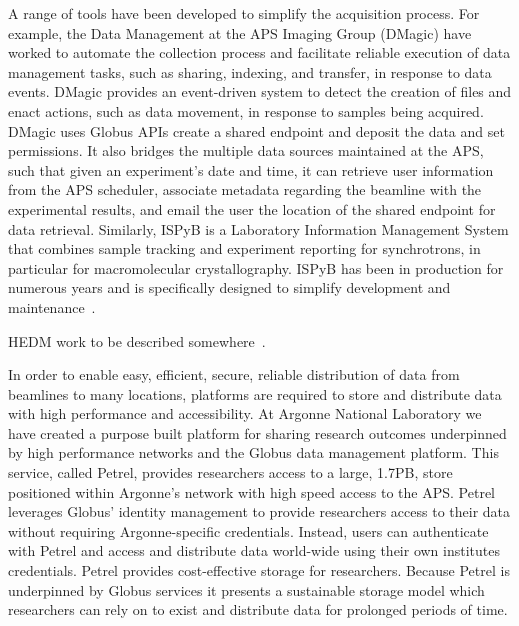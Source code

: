 \documentclass{aip-cp}
\newcommand\ian[1]{}
\newcommand\ian[1]{{\color{red}[Ian: #1]}}
\begin{document}
A range of tools have been developed to simplify the acquisition process. For example, the Data 
Management at the APS Imaging Group (DMagic) have worked to automate the collection process and 
facilitate reliable execution of data management tasks, such as sharing, indexing, and transfer, in 
response to data events. DMagic provides an event-driven system to detect the creation of files and 
enact actions, such as data movement, in response to samples being acquired. DMagic uses Globus 
APIs create a shared endpoint and deposit the data and set permissions. It also bridges the 
multiple data sources maintained at the APS, such that given an experiment's date and time, it can 
retrieve user information from the APS scheduler, associate metadata regarding the beamline with 
the experimental results, and email the user the location of the shared endpoint for data 
retrieval. Similarly, ISPyB is a 
Laboratory Information Management System that combines sample tracking and experiment 
reporting for synchrotrons, in particular for macromolecular crystallography. ISPyB has been in 
production for numerous years and is specifically designed to simplify development and 
maintenance~\cite{delageniere2011ispyb}.



HEDM work to be described somewhere~\cite{park2015high}.


\ian{Petrel should get a mention.}


In order to enable easy, efficient, secure, reliable distribution of data from beamlines to many 
locations, platforms are required to store and distribute data with high performance and 
accessibility. At Argonne National Laboratory we have created a purpose built platform for sharing 
research outcomes underpinned by high performance networks and the Globus data management platform. 
This service, called Petrel, provides researchers access to a large, 1.7PB, store positioned within 
Argonne's network with high speed access to the APS. Petrel leverages Globus' identity management 
to provide researchers access to their data without requiring Argonne-specific credentials. 
Instead, users can authenticate with Petrel and access and distribute data world-wide using their 
own institutes credentials. Petrel provides cost-effective storage for researchers. Because Petrel 
is underpinned by Globus services it presents a sustainable storage model which researchers can 
rely on to exist and distribute data for prolonged periods of time.
\end{document}
